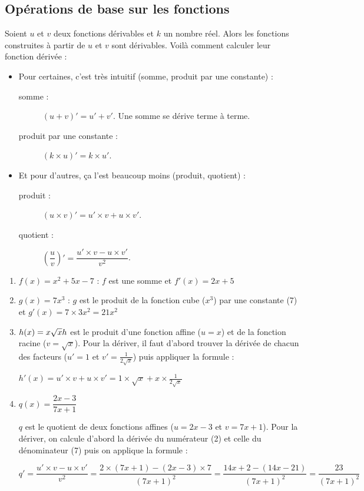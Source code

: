\documentclass[a4paper,11pt]{article}
\begin{document}
\subsection{Opérations de base sur les fonctions}

\begin{cthm}
Soient $u$ et $v$ deux fonctions dérivables et $k$ un nombre réel. Alors les fonctions construites à partir de $u$ et $v$ sont dérivables. Voilà comment calculer leur fonction dérivée :
\begin{itemize}[leftmargin=*]
	\item Pour certaines, c'est très intuitif (somme, produit par une constante) :
	\begin{description}
		\item [somme :] $(u+v)'=u'+v'$. Une somme se dérive terme à terme.
		\item [produit par une constante :] $(k \times u)'=k \times u'$.
	\end{description} 
	
	\item Et pour d'autres, ça l'est beaucoup moins (produit, quotient) :
	\begin{description}
		\item[produit :] $(u \times v)'=u' \times v + u \times v' $.
		\item[quotient :] $\left(\dfrac{u}{v} \right) ' = \dfrac{u' \times v - u \times v'}{v^2} $.
	\end{description}
\end{itemize}
\end{cthm}

\begin{cexemple}[s]
\vspace{-0.3cm}
\begin{enumerate}[leftmargin=*]
	\item $f(x)=x^2+5x-7$  : $f$ est une somme et $f'(x)=2x+5$
	\item $g(x)=7x^3$ : $g$ est le produit de la fonction cube ($x^3$) par une constante (7) et $g'(x)=7 \times 3x^2=21x^2$
	\item $h(x)=x\sqrt{x}\\ h$ est le produit d'une fonction affine ($u=x$) et de la fonction racine ($v=\sqrt{x}$). Pour la dériver, il faut d'abord trouver la dérivée de chacun des facteurs ($u'=1$ et $v'=\frac{1}{2\sqrt{x}}$) puis appliquer la formule :
	
	$h'(x)=u' \times v + u \times v' = 1 \times \sqrt{x} + x \times \frac{1}{2\sqrt{x}}$
	\item $q(x)=\dfrac{2x-3}{7x+1}$
	
	\smallskip
	
	$q$ est le quotient de deux fonctions affines ($u=2x-3$ et $v=7x+1$). Pour la dériver, on calcule d'abord la dérivée du numérateur (2) et celle du dénominateur (7) puis on applique la formule :
	
	$q'= \dfrac{u' \times v - u \times v'}{v^2}=\dfrac{2 \times (7x+1) - (2x-3) \times 7}{(7x+1)^2} = \dfrac{14x+2-(14x-21)}{(7x+1)^2}=\dfrac{23}{(7x+1)^2}$
\end{enumerate}
\end{cexemple}
\end{document}
